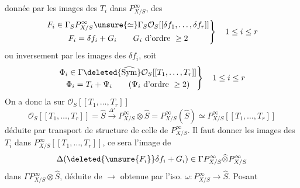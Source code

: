 donnée par les images des $T_i$ dans $P^\infty_{X/S}$, des
\[
\left.\begin{gathered}
F_i\in\Gamma_S P^\infty_{X/S}\unsure{\simeq}\Gamma_S\mathcal{O}_S[[\delta f_1,\ldots,\delta f_r]]\\
F_i=\delta f_i+G_i\qquad G_i\text{ d'ordre }\geq2
\end{gathered}\right\}\quad1\leq i\leq r
\]
ou inversement par les images des $\delta f_i$, soit
\[
\left.\begin{gathered}
\Phi_i\in\Gamma\deleted{\widehat{\operatorname{Sym}}}\mathcal{O}_S[[T_1,\ldots,T_r]]\\
\Phi_i=T_i+\Psi_i\qquad(\Psi_i\text{ d'ordre }\geq2)
\end{gathered}\right\}\quad1\leq i\leq r
\]
On a donc la   sur $\mathcal{O}_S[[T_1,\ldots,T_r]]$
\[
\mathcal{O}_S[[T_1,\ldots,T_r]]=\widehat S\xrightarrow{\Delta'}P^\infty_{X/S}\otimes\widehat S=P^\infty_{X/S}(\widehat S)\simeq P^\infty_{X/S}[[T_1,\ldots,T_r]]
\]
déduite par transport de structure de celle de $P^\infty_{X/S}$. Il faut donner les images des $T_i$ dans $P^\infty_{X/S}[[T_1,\ldots,T_r]]$, ce sera l'image de
\[
\Delta(\deleted{\unsure{F_i}}\delta f_i+G_i)\in\Gamma P^\infty_{X/S}\widehat\otimes P^\infty_{X/S}
\]
dans $\Gamma P^\infty_{X/S}\otimes\widehat S$, déduite de $\longrightarrow$ obtenue par l'iso. $\omega:P^\infty_{X/S}\to\widehat S$. Posant
